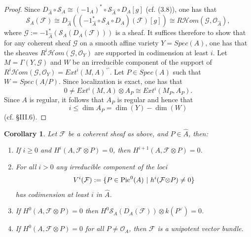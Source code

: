 \documentclass[10pt]{amsart}
\newtheorem{cor}[thm]{Corollary}
\newcommand\Pic{{\text{\rm Pic}}}
\newcommand\ot{{\otimes}}
\newcommand\OO{{\mathcal{O}}}
\newcommand\FF{{\mathcal{F}}}
\newcommand\GG{{\mathcal{G}}}
\newcommand\Hom{{\mathcal{H}om}}
\newcommand\s{{ {\mathcal S}}}
\begin{document}
\begin{proof} Since $D_{\hat {A}}\circ \s _A \cong (-1_A)^*\circ \s_{\hat{A}}
\circ D_A [g]$ (cf. \cite{Mu} (3.8)), one has that
$$\s _A (\FF) \cong 
D_{\hat{A}} \left((-1_{\hat {A}}^*\circ  \s _A 
\circ D_A)(\FF)[g]\right)\cong
R\Hom \left( \GG,\OO _{\hat{A}} \right),$$
where $\GG:=-1^*_{\hat{A}}( \s _A ( D_A(\FF )))$ is a sheaf.
It suffices therefore to show that for any coherent sheaf $\GG$ on a smooth 
affine variety $Y=Spec(A)$, one has that
the sheaves $R^i\Hom( \GG, \OO _Y)$ are supported in codimension at 
least $i$.
Let $M=\Gamma (Y,\GG )$ and $W$ be an irreducible component of the support of 
$R^i\Hom ( \GG, \OO _Y)={Ext^i(M,A)}^\backsim$. Let $P\in Spec (A)$ such that
$W=Spec (A/P)$. 
Since localization is exact, one has that
$$0\neq Ext^i (M,A)\ot   A_P\cong
Ext^i (M_P,A_P).$$
Since $A$ is regular, it follows that $A_P$ is regular and hence that
$$i\leq\dim A_P=\dim (Y)-\dim (W)$$ (cf. \cite{Ha1} \S III.6).
\end{proof}
 \begin{cor}\label{C1} Let $\FF$ be a coherent sheaf as above, 
and $P\in \hat{A}
$,
 then:
 \begin{enumerate}
 
 \item If $i\geq 0$ and $H^i(A,\FF \ot P)=0$, then $H^{i+1}(A,\FF \ot P)=0$.

\item For all $i>0$ any irreducible component of the loci
$$V^i(\FF ):=\{ P\in \Pic ^0(A)\ |\ h^i(\FF \ot P)\ne 0\}$$
has codimension at least $i$ in $\hat {A}$.
 
 \item If $H^0(A, \FF \ot P)=0$ then $H^0\s _A (D_A(\FF))\ot k(P^\vee )=0$.

 \item If $H^0(A,\FF \ot P)=0$ for all $P\ne \OO _A$, then $\FF$ is a 
 unipotent vector bundle.
 \end{enumerate}
 \end{cor}
\end{document}
